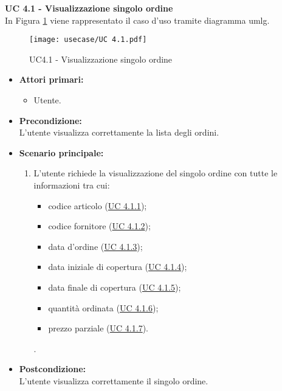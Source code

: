 \noindent \textbf{\large UC 4.1 - Visualizzazione singolo ordine}\\[0.2cm]
\label{uc:visualizzazione-singolo-ordine}
\noindent In Figura \ref{use-case-4.1} viene rappresentato il caso d'uso tramite diagramma \gls{umlg}.
\begin{figure}[!h] 
    \centering 
    \texttt{[image: usecase/UC 4.1.pdf]} 
    \caption{UC4.1 - Visualizzazione singolo ordine}
	\label{use-case-4.1}
\end{figure}
\begin{itemize}

	\item \textbf{Attori primari: }
		\begin{itemize}
			\item Utente.
		\end{itemize}

	\item \textbf{Precondizione: }\\[0.3cm]
		L'utente visualizza correttamente la lista degli ordini.
		
	\vspace*{\fill}

		\newpage
	
	\item \textbf{Scenario principale: }
		\begin{enumerate}
			\item L'utente richiede la visualizzazione del singolo ordine con tutte le informazioni tra cui:
			\begin{itemize}
				\item codice articolo (\hyperref[uc:visualizzazione-codice-articolo]{UC 4.1.1});
				\item codice fornitore (\hyperref[uc:visualizzazione-codice-fornitore]{UC 4.1.2});
				\item data d'ordine (\hyperref[uc:visualizzazione-data-ordine]{UC 4.1.3});
				\item data iniziale di copertura (\hyperref[uc:visualizzazione-data-iniziale-copertura]{UC 4.1.4});
				\item data finale di copertura (\hyperref[uc:visualizzazione-data-finale-copertura]{UC 4.1.5});
				\item quantità ordinata (\hyperref[uc:visualizzazione-quantita-ordinata]{UC 4.1.6});
				\item prezzo parziale (\hyperref[uc:visualizzazione-prezzo-parziale-ord]{UC 4.1.7}).
			\end{itemize}.
		\end{enumerate}
		

	\item \textbf{Postcondizione: }\\[0.3cm]
		L'utente visualizza correttamente il singolo ordine.

\end{itemize}

